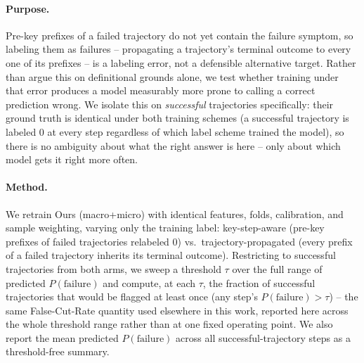 %
%

\paragraph{Purpose.} Pre-key prefixes of a failed trajectory do not yet
contain the failure symptom, so labeling them as failures -- propagating
a trajectory's terminal outcome to every one of its prefixes -- is a
labeling error, not a defensible alternative target. Rather than argue
this on definitional grounds alone, we test whether training under that
error produces a model measurably more prone to calling a correct
prediction wrong. We isolate this on \emph{successful} trajectories
specifically: their ground truth is identical under both training
schemes (a successful trajectory is labeled 0 at every step regardless
of which label scheme trained the model), so there is no ambiguity about
what the right answer is here -- only about which model gets it right
more often.

\paragraph{Method.} We retrain Ours (macro+micro) with identical
features, folds, calibration, and sample weighting, varying only the
training label: key-step-aware (pre-key prefixes of failed trajectories
relabeled 0) vs.\ trajectory-propagated (every prefix of a failed
trajectory inherits its terminal outcome). Restricting to successful
trajectories from both arms, we sweep a threshold $\tau$ over the full
range of predicted $P(\text{failure})$ and compute, at each $\tau$, the
fraction of successful trajectories that would be flagged at least once
(any step's $P(\text{failure}) > \tau$) -- the same False-Cut-Rate
quantity used elsewhere in this work, reported here across the whole
threshold range rather than at one fixed operating point. We also report
the mean predicted $P(\text{failure})$ across all successful-trajectory
steps as a threshold-free summary.

